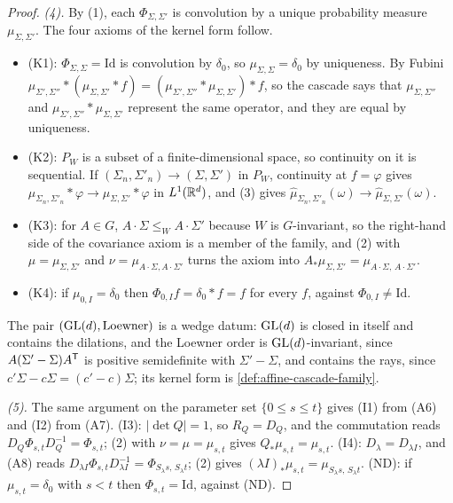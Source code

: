 \begin{proof}
\emph{(4).} By (1), each $\Phi_{\Sigma,\Sigma'}$ is convolution by a unique probability measure
$\mu_{\Sigma,\Sigma'}$. The four axioms of the kernel form follow.
\begin{itemize}
\item (K1): $\Phi_{\Sigma,\Sigma} = \mathrm{Id}$ is convolution by $\delta_0$, so
$\mu_{\Sigma,\Sigma} = \delta_0$ by uniqueness. By Fubini
$\mu_{\Sigma',\Sigma''} * (\mu_{\Sigma,\Sigma'} * f) = (\mu_{\Sigma',\Sigma''} *
\mu_{\Sigma,\Sigma'}) * f$, so the cascade says that $\mu_{\Sigma,\Sigma''}$ and
$\mu_{\Sigma',\Sigma''} * \mu_{\Sigma,\Sigma'}$ represent the same operator, and they are equal by
uniqueness.
\item (K2): $P_W$ is a subset of a finite-dimensional space, so continuity on it is sequential. If
$(\Sigma_n,\Sigma'_n) \to (\Sigma,\Sigma')$ in $P_W$, continuity at $f = \varphi$ gives
$\mu_{\Sigma_n,\Sigma'_n} * \varphi \to \mu_{\Sigma,\Sigma'} * \varphi$ in $L^1(\mathbb{R}^d)$, and (3)
gives $\widehat\mu_{\Sigma_n,\Sigma'_n}(\omega) \to \widehat\mu_{\Sigma,\Sigma'}(\omega)$.
\item (K3): for $A \in G$, $A\cdot\Sigma \le_W A\cdot\Sigma'$ because $W$ is $G$-invariant, so the
right-hand side of the covariance axiom is a member of the family, and (2) with
$\mu = \mu_{\Sigma,\Sigma'}$ and $\nu = \mu_{A\cdot\Sigma,A\cdot\Sigma'}$ turns the axiom into
$A_*\mu_{\Sigma,\Sigma'} = \mu_{A\cdot\Sigma,\,A\cdot\Sigma'}$.
\item (K4): if $\mu_{0,I} = \delta_0$ then $\Phi_{0,I}f = \delta_0 * f = f$ for every $f$, against
$\Phi_{0,I} \ne \mathrm{Id}$.
\end{itemize}
The pair $(\mathrm{GL}(d), \text{Loewner})$ is a wedge
datum: $\mathrm{GL}(d)$ is closed in itself and contains the dilations, and the Loewner order is
$\mathrm{GL}(d)$-invariant, since $A(\Sigma' - \Sigma)A^{\mathsf{T}}$ is positive semidefinite with
$\Sigma' - \Sigma$, and contains the rays, since $c'\Sigma - c\Sigma = (c' - c)\Sigma$; its kernel
form is \ref{def:affine-cascade-family}.

\emph{(5).} The same argument on the parameter set $\{0 \le s \le t\}$ gives (I1) from (A6) and
(I2) from (A7). (I3): $|\det Q| = 1$, so $R_Q = D_Q$, and the commutation reads
$D_Q\Phi_{s,t}D_Q^{-1} = \Phi_{s,t}$; (2) with $\nu = \mu = \mu_{s,t}$ gives
$Q_*\mu_{s,t} = \mu_{s,t}$. (I4): $D_\lambda = D_{\lambda I}$, and (A8) reads
$D_{\lambda I}\Phi_{s,t}D_{\lambda I}^{-1} = \Phi_{S_\lambda s,\,S_\lambda t}$; (2) gives
$(\lambda I)_*\mu_{s,t} = \mu_{S_\lambda s,\,S_\lambda t}$. (ND): if $\mu_{s,t} = \delta_0$ with
$s < t$ then $\Phi_{s,t} = \mathrm{Id}$, against (ND).
\end{proof}

